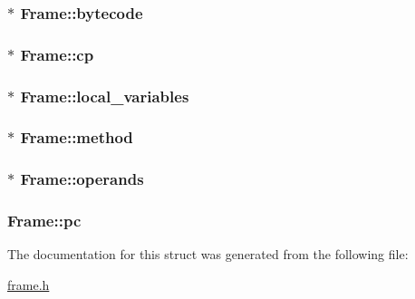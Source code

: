 \subsubsection[{\texorpdfstring{bytecode}{bytecode}}]{$\ast$ Frame\+::bytecode}\hypertarget{structFrame_ad3bdd8cc30352e62af5898b699d54c16}{}\label{structFrame_ad3bdd8cc30352e62af5898b699d54c16}
\subsubsection[{\texorpdfstring{cp}{cp}}]{$\ast$ Frame\+::cp}\hypertarget{structFrame_ada1bd832b6f72f87a35d88c68b9a188a}{}\label{structFrame_ada1bd832b6f72f87a35d88c68b9a188a}
\subsubsection[{\texorpdfstring{local\+\_\+variables}{local_variables}}]{$\ast$ Frame\+::local\+\_\+variables}\hypertarget{structFrame_a1a3968ae645e9c154229a2631639ebd5}{}\label{structFrame_a1a3968ae645e9c154229a2631639ebd5}
\subsubsection[{\texorpdfstring{method}{method}}]{$\ast$ Frame\+::method}\hypertarget{structFrame_af0943cac72b53aa5aa67f3e7097430a1}{}\label{structFrame_af0943cac72b53aa5aa67f3e7097430a1}
\subsubsection[{\texorpdfstring{operands}{operands}}]{$\ast$ Frame\+::operands}\hypertarget{structFrame_ab311fc7762ab460f039e58b024c4d229}{}\label{structFrame_ab311fc7762ab460f039e58b024c4d229}
\subsubsection[{\texorpdfstring{pc}{pc}}]{ Frame\+::pc}\hypertarget{structFrame_ada6a6cf76d00cbadf43a86a686dd026c}{}\label{structFrame_ada6a6cf76d00cbadf43a86a686dd026c}


The documentation for this struct was generated from the following file\+:\begin{DoxyCompactItemize}
\item 
\hyperlink{frame_8h}{frame.\+h}\end{DoxyCompactItemize}

